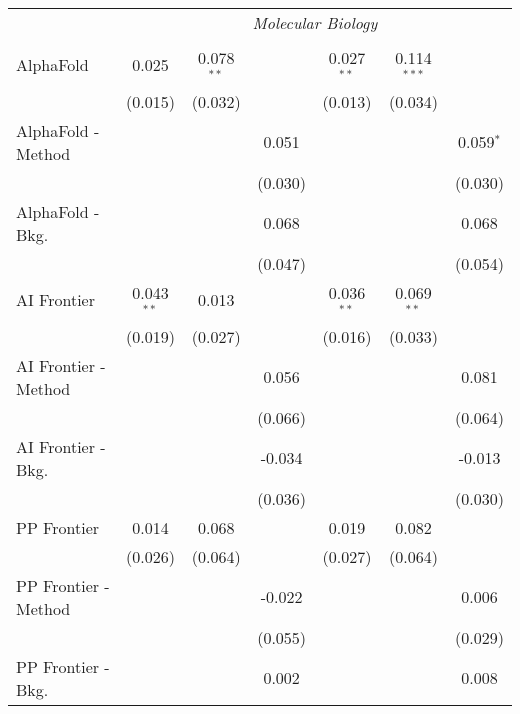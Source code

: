 \begin{tabular}{lcccccc}
 & \multicolumn{6}{c}{\textit{Molecular Biology}} \\ \\
   AlphaFold            & 0.025        & 0.078$^{**}$ &         & 0.027$^{**}$ & 0.114$^{***}$ &   \\   
                        & (0.015)      & (0.032)      &         & (0.013)      & (0.034)       &   \\   
   AlphaFold - Method   &              &              & 0.051   &              &               & 0.059$^{*}$\\   
                        &              &              & (0.030) &              &               & (0.030)\\   
   AlphaFold - Bkg.     &              &              & 0.068   &              &               & 0.068\\   
                        &              &              & (0.047) &              &               & (0.054)\\   
   AI Frontier          & 0.043$^{**}$ & 0.013        &         & 0.036$^{**}$ & 0.069$^{**}$  &   \\   
                        & (0.019)      & (0.027)      &         & (0.016)      & (0.033)       &   \\   
   AI Frontier - Method &              &              & 0.056   &              &               & 0.081\\   
                        &              &              & (0.066) &              &               & (0.064)\\   
   AI Frontier - Bkg.   &              &              & -0.034  &              &               & -0.013\\   
                        &              &              & (0.036) &              &               & (0.030)\\   
   PP Frontier          & 0.014        & 0.068        &         & 0.019        & 0.082         &   \\   
                        & (0.026)      & (0.064)      &         & (0.027)      & (0.064)       &   \\   
   PP Frontier - Method &              &              & -0.022  &              &               & 0.006\\   
                        &              &              & (0.055) &              &               & (0.029)\\   
   PP Frontier - Bkg.   &              &              & 0.002   &              &               & 0.008\\   

\end{tabular}
